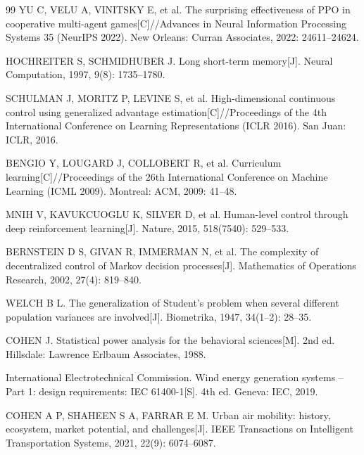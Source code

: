 \documentclass[12pt,a4paper,UTF8]{ctexart}
\begin{document}
\begin{thebibliography}{99}
 YU C, VELU A, VINITSKY E, et al. The surprising effectiveness of PPO in cooperative multi-agent games[C]//Advances in Neural Information Processing Systems 35 (NeurIPS 2022). New Orleans: Curran Associates, 2022: 24611--24624.

 HOCHREITER S, SCHMIDHUBER J. Long short-term memory[J]. Neural Computation, 1997, 9(8): 1735--1780.

 SCHULMAN J, MORITZ P, LEVINE S, et al. High-dimensional continuous control using generalized advantage estimation[C]//Proceedings of the 4th International Conference on Learning Representations (ICLR 2016). San Juan: ICLR, 2016.

 BENGIO Y, LOUGARD J, COLLOBERT R, et al. Curriculum learning[C]//Proceedings of the 26th International Conference on Machine Learning (ICML 2009). Montreal: ACM, 2009: 41--48.

 MNIH V, KAVUKCUOGLU K, SILVER D, et al. Human-level control through deep reinforcement learning[J]. Nature, 2015, 518(7540): 529--533.

 BERNSTEIN D S, GIVAN R, IMMERMAN N, et al. The complexity of decentralized control of Markov decision processes[J]. Mathematics of Operations Research, 2002, 27(4): 819--840.

 WELCH B L. The generalization of Student's problem when several different population variances are involved[J]. Biometrika, 1947, 34(1--2): 28--35.

 COHEN J. Statistical power analysis for the behavioral sciences[M]. 2nd ed. Hillsdale: Lawrence Erlbaum Associates, 1988.

 International Electrotechnical Commission. Wind energy generation systems -- Part 1: design requirements: IEC 61400-1[S]. 4th ed. Geneva: IEC, 2019.

 COHEN A P, SHAHEEN S A, FARRAR E M. Urban air mobility: history, ecosystem, market potential, and challenges[J]. IEEE Transactions on Intelligent Transportation Systems, 2021, 22(9): 6074--6087.

\end{thebibliography}
\end{document}
